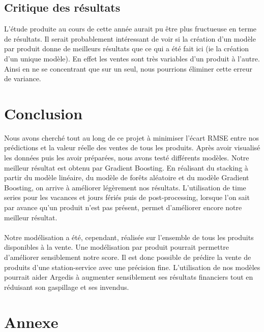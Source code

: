 \documentclass{article} %
\begin{document}
\subsection{Critique des résultats}
L'étude produite au cours de cette année aurait pu être plus fructueuse en terme de résultats. Il serait probablement intéressant de voir si la création d'un modèle par produit donne de meilleurs résultats que ce qui a été fait ici (ie la création d'un unique modèle). En effet les ventes sont très variables d'un produit à l'autre. Ainsi en ne se concentrant que sur un seul, nous pourrions éliminer cette erreur de variance.

\section{Conclusion}
Nous avons cherché tout au long de ce projet à minimiser l’écart RMSE entre nos prédictions et la valeur réelle des ventes de tous les produits. Après avoir visualisé les données puis les avoir préparées, nous avons testé différents modèles. Notre meilleur résultat est obtenu par Gradient Boosting. En réalisant du stacking à partir du modèle linéaire, du modèle de forêts aléatoire et du modèle Gradient Boosting, on arrive à améliorer légèrement nos résultats. L’utilisation de time series pour les vacances et jours fériés puis de post-processing, lorsque l’on sait par avance qu’un produit n’est pas présent, permet d’améliorer encore notre meilleur résultat.\\\\

Notre modélisation a été, cependant, réalisée sur l’ensemble de tous les produits disponibles à la vente. Une modélisation par produit pourrait permettre d’améliorer sensiblement notre score.
Il est donc possible de prédire la vente de produits d’une station-service avec une précision fine. L’utilisation de nos modèles pourrait aider Argedis à augmenter sensiblement ses résultats financiers tout en réduisant son gaspillage et ses invendus.

\newpage
\section{Annexe}
\end{document}
